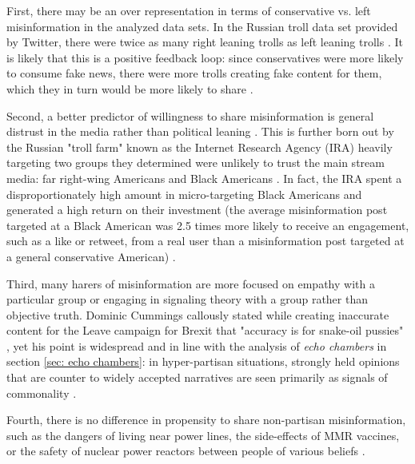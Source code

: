\documentclass[preprint,review,12pt]{elsarticle}
\begin{document}
First, there may be an over representation in terms of conservative vs. left misinformation in the analyzed data sets. In the Russian troll data set provided by Twitter, there were twice as many right leaning trolls as left leaning trolls \cite{freelon2020black,badawy2018analyzing,benkler2018network}. It is likely that this is a positive feedback loop: since conservatives were more likely to consume fake news, there were more trolls creating fake content for them, which they in turn would be more likely to share \cite{bakir2018fake,bodo2019interested,silverman2016analysis,pariser2011filter}. 


Second, a better predictor of willingness to share misinformation is general distrust in the media rather than political leaning \cite{hopp2020people,shin2017partisan,kahan2012ideology,lewandowsky2016motivated,swire2017processing,mourao2019fake}. This is further born out by the Russian "troll farm" known as the Internet Research Agency (IRA) heavily targeting two groups they determined were unlikely to trust the main stream media: far right-wing Americans and Black Americans \cite{diresta2019tactics,howard2019ira,boatwright2018troll,jamieson2020cyberwar,mueller2019mueller,freelon2020black}. In fact, the IRA spent a disproportionately high amount in micro-targeting Black Americans and generated a high return on their investment (the average misinformation post targeted at a Black American was 2.5 times more likely to receive an engagement, such as a like or retweet, from a real user than a misinformation post targeted at a general conservative American) \cite{howard2019ira,freelon2020black}.

Third, many harers of misinformation are more focused on empathy with a particular group \cite{winter2015they,rheault2016measuring,dale2017nlp} or engaging in signaling theory with a group \cite{connelly2011signaling,lampe2007familiar,spence2002signaling} rather than objective truth. Dominic Cummings callously stated while creating inaccurate content for the Leave campaign for Brexit that "accuracy is for snake-oil pussies" \cite{crace2016accuracy}, yet his point is widespread and in line with the analysis of \textit{echo chambers} in section \ref{sec: echo chambers}: in hyper-partisan situations, strongly held opinions that are counter to widely accepted narratives are seen primarily as signals of commonality \cite{yla2018populist,noppari2019user,lazer2018science,yla2019politicization,wasilewski2019us,freelon2020russian}. 


Fourth, there is no difference in propensity to share non-partisan misinformation, such as the dangers of living near power lines, the side-effects of MMR vaccines, or the safety of nuclear power reactors between people of various beliefs \cite{kahan2015climate,hara2016co,kahan2012ideology,lewandowsky2016motivated,barbera2015tweeting}.
\end{document}
